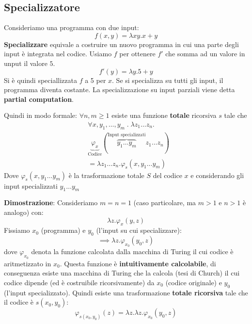 \documentclass[a4paper]{article}
\begin{document}
\subsection{Specializzatore}
\begin{theorem}
  Consideriamo una programma con due input:
  \[
    f(x,y) = \lambda x y . x + y
  \] 
  \textbf{Specializzare} equivale a costruire un nuovo programma in cui una parte
  degli input è integrata nel codice.
  Usiamo \( f \) per ottenere \( f' \) che somma ad un valore in unput il valore \( 5 \).
  \[
    f'(y) = \lambda y . 5 + y
  \] 
  Si è quindi speciallizzata \( f \) a 5 per \( x \). Se si specializza su tutti gli
  input, il programma diventa costante. La specializzazione su input parziali viene
  detta \textbf{partial computation}.

  \vspace{1em}
  \noindent
  Quindi in modo formale:
  \( \forall n, m \ge 1 \) esiste una funzione \textbf{totale} ricorsiva \( s \) tale che
  \[
    \begin{aligned}
      &\forall x, y_1, \ldots, y_m \;.\; \lambda z_1 \ldots z_n . \\
      &\underbrace{\varphi_x}_{\text{Codice}}(\overbrace{y_1 \ldots y_m}^{\text{Input specializzati}}
      z_1 \ldots z_n)\\
      &= \lambda z_1 \ldots z_n . \varphi_s(x, y_1 \ldots y_m)
    \end{aligned}
  \]
  Dove \( \varphi_s(x, y_1 \ldots y_m) \) è la trasformazione totale \( S \) del codice \( x \) 
  e considerando gli input specializzati \( y_1 \ldots y_m \) 

  \vspace{1em}
  \noindent
  \textbf{Dimostrazione}: Consideriamo \( m = n = 1 \) (caso particolare, ma \( m > 1 \) e
  \( n > 1 \) è analogo) con:
  \[
    \lambda z . \varphi_x(y,z)
  \] 
  Fissiamo \( x_0 \) (programma) e \( y_0 \) (l'input su cui specializzare):
  \[
    \implies \lambda z . \varphi_{x_0}(y_0, z)
  \] 
  dove \( \varphi_{x_0} \) denota la funzione calcolata dalla macchina di Turing il cui
  codice è aritmetizzato in \( x_0 \). Questa funzione è \textbf{intuitivamente calcolabile},
  di conseguenza esiste una macchina di Turing che la calcola (tesi di Church) il cui
  codice dipende (ed è costruibile ricorsivamente) da \( x_0 \) (codice originale) e
  \( y_0 \) (l'input specializzato). Quindi esiste una trasformazione \textbf{totale ricorsiva}
  tale che il codice è \( s(x_0, y_0) \):
  \[
    \varphi_{s(x_0, y_0)}(z) = \lambda z . \lambda z . \varphi_{x_0}(y_0, z)
  \] 
\end{theorem}
\end{document}

